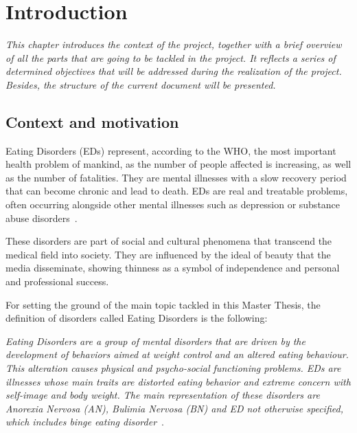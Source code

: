 \chapter{Introduction}
\label{chap:introduction}

\textit{
This chapter introduces the context of the project, together with a brief overview of all the parts that are going to be tackled in the project. It reflects a series of determined objectives that will be addressed during the realization of the project. Besides, the structure of the current document will be presented.
}



\clearpage

\section{Context and motivation}
\label{sec:context}


Eating Disorders (EDs) represent, according to the WHO, the most important health problem of mankind, as the number of people affected is increasing, as well as the number of fatalities. They are mental illnesses with a slow recovery period that can become chronic and lead to death. EDs are real and treatable problems, often occurring alongside other mental illnesses such as depression or substance abuse disorders~\cite{baldares2013trastornos}.

These disorders are part of social and cultural phenomena that transcend the medical field into society. They are influenced by the ideal of beauty that the media disseminate, showing thinness as a symbol of independence and personal and professional success.


For setting the ground of the main topic tackled in this Master Thesis, the definition of disorders called Eating Disorders is the following:  

\textit{Eating Disorders are a group of mental disorders that are driven by the development of behaviors aimed at weight control and an altered eating behaviour. This alteration causes physical and psycho-social functioning problems. EDs are illnesses whose main traits are distorted eating behavior and extreme concern with self-image and body weight. The main representation of these disorders are Anorexia Nervosa (AN), Bulimia Nervosa (BN) and ED not otherwise specified, which includes binge eating disorder}~\cite{baldares2013trastornos}.

